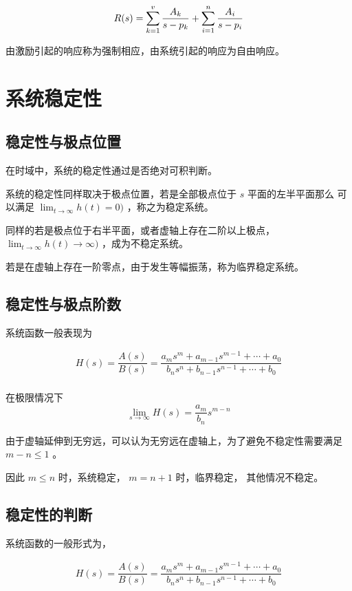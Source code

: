 \documentclass[cn,11pt,chinese,black,simple]{../elegantbook}
\begin{document}
\[R(s) = \displaystyle\sum_{k=1}^v \dfrac{A_k}{s - p_k} + \displaystyle\sum_{i = 1}^n \dfrac{A_i}{s - p_i}\]

由激励引起的响应称为强制相应，由系统引起的响应为自由响应。

\section{系统稳定性}

\subsection{稳定性与极点位置}

在时域中，系统的稳定性通过是否绝对可积判断。

系统的稳定性同样取决于极点位置，若是全部极点位于 \(s\) 平面的左半平面那么 可以满足 \(\displaystyle\lim_{t\rightarrow \infty} h(t) = 0)\) ，称之为稳定系统。

同样的若是极点位于右半平面，或者虚轴上存在二阶以上极点， \(\displaystyle\lim_{t\rightarrow \infty} h(t) \rightarrow \infty)\) ，成为不稳定系统。

若是在虚轴上存在一阶零点，由于发生等幅振荡，称为临界稳定系统。

\subsection{稳定性与极点阶数}

系统函数一般表现为

\[\begin{array}{l}
    H(s)=\dfrac{A(s)}{B(s)}=\dfrac{a_{m} s^{m}+a_{m-1} s^{m-1}+\cdots+a_{0}}{b_{n} s^{n}+b_{n-1} s^{n-1}+\cdots+b_{0}} \\
\end{array}\]

在极限情况下 \[\lim _{s \rightarrow \infty} H(s)=\dfrac{a_{m}}{b_{n}} s^{m-n}\]

由于虚轴延伸到无穷远，可以认为无穷远在虚轴上，为了避免不稳定性需要满足 \(m-n \leq 1\) 。

因此 \(m \leq n\) 时，系统稳定，
\(m = n + 1\) 时，临界稳定，
其他情况不稳定。

\subsection{稳定性的判断}

系统函数的一般形式为，

\[\begin{array}{l}
    H(s)=\dfrac{A(s)}{B(s)}=\dfrac{a_{m} s^{m}+a_{m-1} s^{m-1}+\cdots+a_{0}}{b_{n} s^{n}+b_{n-1} s^{n-1}+\cdots+b_{0}} \\
\end{array}\]
\end{document}
